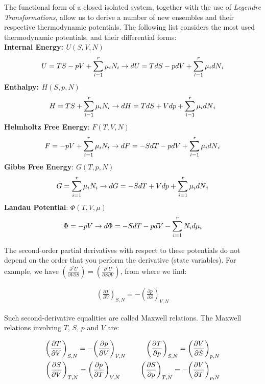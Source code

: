 \documentclass[book.tex]{subfiles}
\begin{document}
The functional form of a closed isolated system, together with the use of \textit{Legendre Transformations}, allow us to derive a number of new ensembles and their respective thermodynamic potentials. The following list considers the most used thermodynamic potentials, and their differential forms:
\\
\textbf{Internal Energy: $U(S,V,N)$}
\begin{align}
U = TS - pV	+ \sum^r_{i=1}\mu_i{N}_i \rightarrow dU = TdS - pdV	+ \sum^r_{i=1}\mu_i{dN}_i \notag
\end{align}
\textbf{Enthalpy: $H(S,p,N)$} 
\begin{align}
H = TS	+ \sum^r_{i=1}\mu_i{N}_i \rightarrow dH = TdS + Vdp	+ \sum^r_{i=1}\mu_i{dN}_i \notag
\end{align}
\textbf{Helmholtz Free Energy}: $F(T,V,N)$
\begin{align}
F = -pV	+ \sum^r_{i=1}\mu_i{N}_i \rightarrow dF = -SdT - pdV	+ \sum^r_{i=1}\mu_i{dN}_i \notag
\end{align}
\textbf{Gibbs Free Energy}: $G(T,p,N)$
\begin{align}
G = \sum^r_{i=1}\mu_i{N}_i \rightarrow dG = -SdT + Vdp	+ \sum^r_{i=1}\mu_i{dN}_i \notag
\end{align}
\textbf{Landau Potential}: $\Phi(T,V,\mu)$
\begin{align}
\Phi = -pV \rightarrow d\Phi = -SdT - pdV	- \sum^r_{i=1}{N}_id\mu_i \notag
\end{align}

The second-order partial derivatives with respect to these potentials do not depend on the order that you perform the derivative (state variables). For example, we have $\left(\frac{\partial^2 U}{\partial V \partial S}\right) = \left(\frac{\partial^2 U}{\partial S \partial V}\right)$, from where we find:

\begin{align}\label{T-prelation}
{\left(\frac{\partial T}{\partial V}\right)}_{S,N} =  
-{\left(\frac{\partial p}{\partial S}\right)}_{V,N}
\end{align}

Such second-derivative equalities are called Maxwell relations. The Maxwell relations involving $T$, $S$, $p$ and $V$ are:

\begin{align}
{\left(\frac{\partial T}{\partial V}\right)}_{S,N} =  
-{\left(\frac{\partial p}{\partial V}\right)}_{V,N} \hspace{1.0cm} {\left(\frac{\partial T}{\partial p}\right)}_{S,N} =  
{\left(\frac{\partial V}{\partial S}\right)}_{p,N} \notag \\
{\left(\frac{\partial S}{\partial V}\right)}_{T,N} =  
{\left(\frac{\partial p}{\partial T}\right)}_{V,N} \hspace{1.0cm} {\left(\frac{\partial S}{\partial p}\right)}_{T,N} =  
-{\left(\frac{\partial V}{\partial T}\right)}_{p,N} \notag
\end{align}
\end{document}
